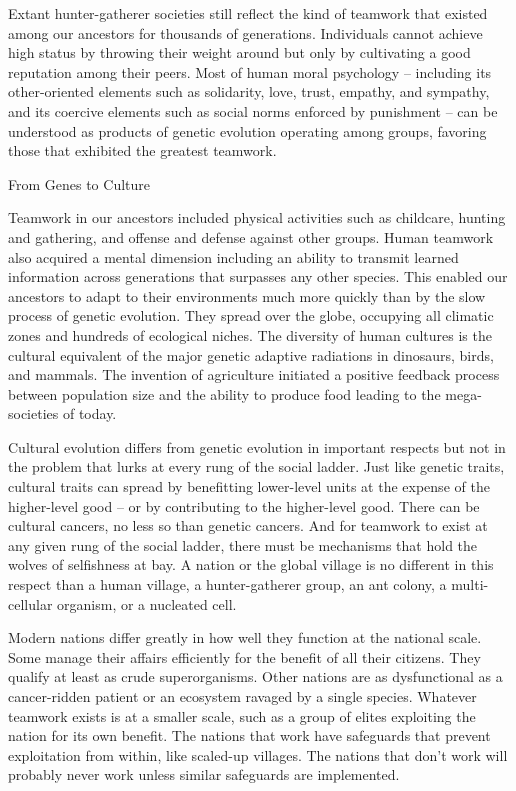 \documentclass[
]{book}
\begin{document}
Extant hunter-gatherer societies still reflect the kind of teamwork that existed among our ancestors for thousands of generations. Individuals cannot achieve high status by throwing their weight around but only by cultivating a good reputation among their peers. Most of human moral psychology -- including its other-oriented elements such as solidarity, love, trust, empathy, and sympathy, and its coercive elements such as social norms enforced by punishment -- can be understood as products of genetic evolution operating among groups, favoring those that exhibited the greatest teamwork.

From Genes to Culture

Teamwork in our ancestors included physical activities such as childcare, hunting and gathering, and offense and defense against other groups. Human teamwork also acquired a mental dimension including an ability to transmit learned information across generations that surpasses any other species. This enabled our ancestors to adapt to their environments much more quickly than by the slow process of genetic evolution. They spread over the globe, occupying all climatic zones and hundreds of ecological niches. The diversity of human cultures is the cultural equivalent of the major genetic adaptive radiations in dinosaurs, birds, and mammals. The invention of agriculture initiated a positive feedback process between population size and the ability to produce food leading to the mega-societies of today.

Cultural evolution differs from genetic evolution in important respects but not in the problem that lurks at every rung of the social ladder. Just like genetic traits, cultural traits can spread by benefitting lower-level units at the expense of the higher-level good -- or by contributing to the higher-level good. There can be cultural cancers, no less so than genetic cancers. And for teamwork to exist at any given rung of the social ladder, there must be mechanisms that hold the wolves of selfishness at bay. A nation or the global village is no different in this respect than a human village, a hunter-gatherer group, an ant colony, a multi-cellular organism, or a nucleated cell.

Modern nations differ greatly in how well they function at the national scale. Some manage their affairs efficiently for the benefit of all their citizens. They qualify at least as crude superorganisms. Other nations are as dysfunctional as a cancer-ridden patient or an ecosystem ravaged by a single species. Whatever teamwork exists is at a smaller scale, such as a group of elites exploiting the nation for its own benefit. The nations that work have safeguards that prevent exploitation from within, like scaled-up villages. The nations that don't work will probably never work unless similar safeguards are implemented.
\end{document}
